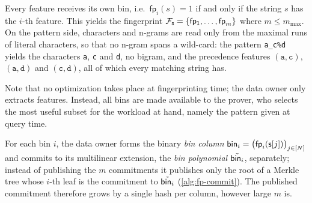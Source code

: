 Every feature receives its own bin, i.e.\ $\mathsf{fp}_i(s) = 1$ if and only if the string $s$ has the $i$-th feature. This yields the fingerprint $\mathcal{F}_{\mathsf{s}}=\{\mathsf{fp_1},\dots,\mathsf{fp}_m\}$ where $m\leq m_{\max}$. On the pattern side, characters and n-grams are read only from the maximal runs of literal characters, so that no n-gram spans a wild-card: the pattern \texttt{a\_c\%d} yields the characters \texttt{a}, \texttt{c} and \texttt{d}, no bigram, and the precedence features $(\texttt{a},\texttt{c})$, $(\texttt{a},\texttt{d})$ and $(\texttt{c},\texttt{d})$, all of which every matching string has. 

Note that no optimization takes place at fingerprinting time; the data owner only extracts features. Instead, all bins are made available to the prover, who selects the most useful subset for the workload at hand, namely the pattern given at query time.

For each bin $i$, the data owner forms the binary \emph{bin column} $\mathsf{bin}_i = \bigl(\mathsf{fp}_i(\mathsf{s}[j])\bigr)_{j \in [N]}$ and commits to its multilinear extension, the \emph{bin polynomial} $\tilde{\mathsf{bin}_i}$, separately; instead of publishing the $m$ commitments it publishes only the root of a Merkle tree whose $i$-th leaf is the commitment to $\tilde{\mathsf{bin}_i}$ (\cref{alg:fp-commit}). The published commitment therefore grows by a single hash per column, however large $m$ is. 

